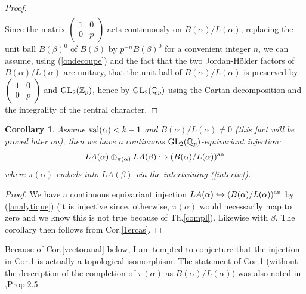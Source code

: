 \documentclass[11pt]{amsart}
\def\Z{{\mathbb Z}_p}
\def\Q{{\mathbb Q}_p}
\def\G{{\rm GL}_2(\Q)}
\def\K{{\rm GL}_2(\Z)}
\newtheorem{cor}[definit]{\bf{Corollary}}
\begin{document}
\begin{proof}
\begin{eqnarray}
\end{eqnarray} 
Since the matrix $\begin{pmatrix}1&0\\0&p\end{pmatrix}$ acts
  continuously on $B(\alpha)/L(\alpha)$, replacing the unit ball
  $B(\beta)^0$ of $B(\beta)$ by $p^{-n}B(\beta)^0$ for a convenient
  integer $n$, we can assume, using (\ref{ondecoupe}) and the fact
  that the two Jordan-H\"older factors of $B(\alpha)/L(\alpha)$ are
  unitary, that the unit ball of $B(\alpha)/L(\alpha)$ is preserved by
  $\begin{pmatrix}1&0\\0&p\end{pmatrix}$ and $\K$, hence by $\G$ using
    the Cartan decomposition and the integrality of the central
    character.  
\end{proof} 
 
\begin{cor}\label{vectoranal2} 
Assume ${\rm val}(\alpha)<k-1$ and $B(\alpha)/L(\alpha)\ne 0$ 
(this fact will be proved later on), then we have a continuous $\G$-equivariant injection: 
$$LA(\alpha)\oplus_{\pi(\alpha)}LA(\beta)\hookrightarrow (B(\alpha)/L(\alpha))^{\rm an}$$ 
where $\pi(\alpha)$ embeds into $LA(\beta)$ via the intertwining
(\ref{intertw}).  
\end{cor} 
\begin{proof} 
We have a continuous equivariant injection $LA(\alpha)\hookrightarrow
(B(\alpha)/L(\alpha))^{\rm an}$ by (\ref{analytique}) (it is injective
since, otherwise, $\pi(\alpha)$ would necessarily map to zero and we
know this is not true because of Th.\ref{compl}). Likewise with
$\beta$. The corollary then follows from Cor.\ref{1ercas}.  
\end{proof} 
 
Because of Cor.\ref{vectoranal} below, I am tempted to conjecture that
the injection in Cor.\ref{vectoranal2} is actually a topological
isomorphism. The statement of Cor.\ref{vectoranal2} (without the
description of the completion of $\pi(\alpha)$ as
$B(\alpha)/L(\alpha)$) was also noted in \cite{Em},Prop.2.5.  
 
\end{document}
